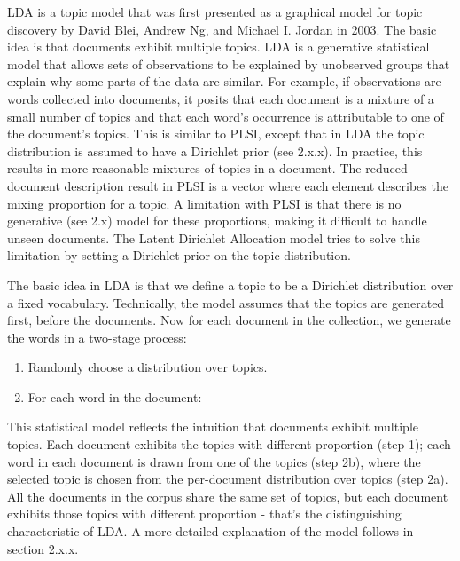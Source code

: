 \documentclass[12pt]{report}
\begin{document}
LDA is a topic model that was first presented as a graphical model for topic discovery by David Blei, Andrew Ng, and Michael I. Jordan in 2003. 
The basic idea is that documents exhibit multiple topics. 
LDA is a generative statistical model that allows sets of observations to be explained by unobserved groups that explain why some parts of the data are similar. 
For example, if observations are words collected into documents, it posits that each document is a mixture of a small number of topics and that each word's occurrence is attributable to one of the document's topics. 
This is similar to PLSI, except that in LDA the topic distribution is assumed to have a Dirichlet prior (see 2.x.x). 
In practice, this results in more reasonable mixtures of topics in a document. 
The reduced document description result in PLSI is a vector where each element describes the mixing proportion for a topic. 
A limitation with PLSI is that there is no generative (see 2.x) model for these proportions, making it difficult to handle unseen documents. 
The Latent Dirichlet Allocation model tries to solve this limitation by setting a Dirichlet prior on the topic distribution.


The basic idea in LDA is that  we define a topic to be a Dirichlet distribution over a fixed vocabulary. 
Technically, the model assumes that the topics are generated first, before the documents. 
Now for each document in the collection, we generate the words in a two-stage process:


\begin{enumerate}
\item Randomly choose a distribution over topics.
\item For each word in the document:
\end{enumerate}


This statistical model reflects the intuition that documents exhibit multiple topics. 
Each document exhibits the topics with different proportion (step 1); 
each word in each document is drawn from one of the topics (step 2b), where the selected topic is chosen from the per-document distribution over topics (step 2a). 
All the documents in the corpus share the same set of topics, but each document exhibits those topics with different proportion - that’s the distinguishing characteristic of LDA.
A more detailed explanation of the model follows in section 2.x.x.
\end{document}
